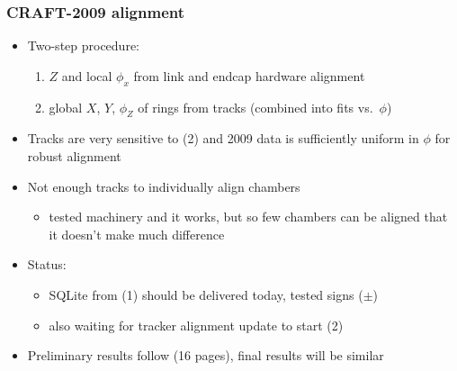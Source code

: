 \documentclass[compress]{beamer}
\begin{document}
\begin{frame}
\frametitle{CRAFT-2009 alignment}
\begin{itemize}\setlength{\itemsep}{0.3 cm}
\item Two-step procedure:
\begin{enumerate}
\item $Z$ and local $\phi_x$ from link and endcap hardware alignment
\item global $X$, $Y$, $\phi_Z$ of rings from tracks (combined into fits vs.~$\phi$)
\end{enumerate}

\item Tracks are very sensitive to (2) and 2009 data is sufficiently uniform in $\phi$ for robust alignment

\item Not enough tracks to individually align chambers
\begin{itemize}
\item tested machinery and it works, but so few chambers can be aligned that it doesn't make much difference
\end{itemize}

\item Status:
\begin{itemize}
\item SQLite from (1) should be delivered today, tested signs ($\pm$)
\item also waiting for tracker alignment update to start (2)
\end{itemize}

\item Preliminary results follow (16 pages), final results will be similar
\end{itemize}
\end{frame}
\end{document}
